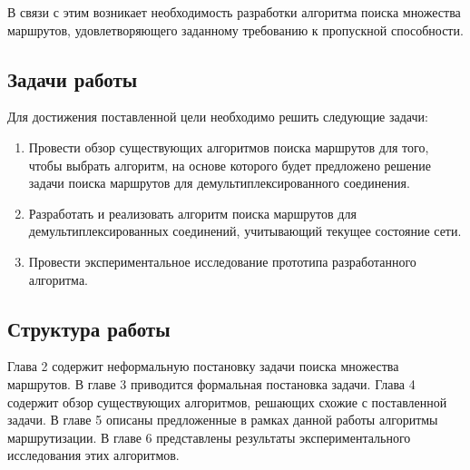 \documentclass[a4paper]{article}
\begin{document}
В связи с этим возникает необходимость разработки алгоритма поиска множества маршрутов, удовлетворяющего заданному требованию к пропускной способности.

\subsection{Задачи работы}
Для достижения поставленной цели необходимо решить следующие задачи:
\begin{enumerate}
\item Провести обзор существующих алгоритмов поиска маршрутов для того, чтобы выбрать алгоритм, на основе которого будет предложено решение задачи поиска маршрутов для демультиплексированного соединения.
\item Разработать и реализовать алгоритм поиска маршрутов для демультиплексированных соединений, учитывающий текущее состояние сети.
\item Провести экспериментальное исследование прототипа разработанного алгоритма.
\end{enumerate}

\subsection{Структура работы}
Глава 2 содержит неформальную постановку задачи поиска множества маршрутов. В главе 3 приводится формальная постановка задачи. Глава 4 содержит обзор существующих алгоритмов, решающих схожие с поставленной задачи. В главе 5 описаны предложенные в рамках данной работы алгоритмы маршрутизации. В главе 6 представлены результаты экспериментального исследования этих алгоритмов.



\newpage
\end{document}
